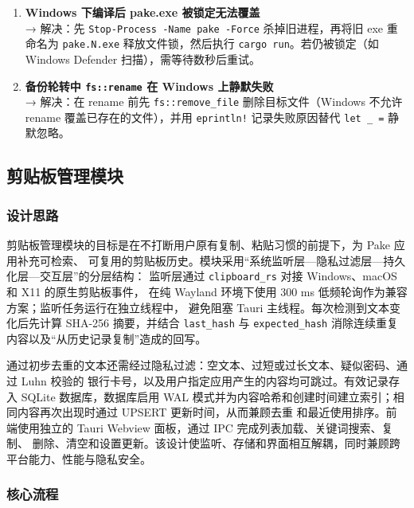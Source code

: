 \documentclass[12pt,a4paper]{ctexart}
\begin{document}
\begin{enumerate}[label=(\arabic*)]
  \item \textbf{Windows 下编译后 pake.exe 被锁定无法覆盖}
    \\→ 解决：先 \texttt{Stop-Process -Name pake -Force} 杀掉旧进程，再将旧 exe 重命名为 \texttt{pake.N.exe} 释放文件锁，然后执行 \texttt{cargo run}。若仍被锁定（如 Windows Defender 扫描），需等待数秒后重试。

  \item \textbf{备份轮转中 \texttt{fs::rename} 在 Windows 上静默失败}
    \\→ 解决：在 rename 前先 \texttt{fs::remove\_file} 删除目标文件（Windows 不允许 rename 覆盖已存在的文件），并用 \texttt{eprintln!} 记录失败原因替代 \texttt{let \_ =} 静默忽略。
\end{enumerate}

\subsection{剪贴板管理模块}

\subsubsection{设计思路}

剪贴板管理模块的目标是在不打断用户原有复制、粘贴习惯的前提下，为 Pake 应用补充可检索、
可复用的剪贴板历史。模块采用“系统监听层—隐私过滤层—持久化层—交互层”的分层结构：
监听层通过 \texttt{clipboard\_rs} 对接 Windows、macOS 和 X11 的原生剪贴板事件，
在纯 Wayland 环境下使用 300 ms 低频轮询作为兼容方案；监听任务运行在独立线程中，
避免阻塞 Tauri 主线程。每次检测到文本变化后先计算 SHA-256 摘要，并结合
\texttt{last\_hash} 与 \texttt{expected\_hash} 消除连续重复内容以及“从历史记录复制”造成的回写。

通过初步去重的文本还需经过隐私过滤：空文本、过短或过长文本、疑似密码、通过 Luhn 校验的
银行卡号，以及用户指定应用产生的内容均可跳过。有效记录存入 SQLite 数据库，数据库启用 WAL
模式并为内容哈希和创建时间建立索引；相同内容再次出现时通过 UPSERT 更新时间，从而兼顾去重
和最近使用排序。前端使用独立的 Tauri Webview 面板，通过 IPC 完成列表加载、关键词搜索、复制、
删除、清空和设置更新。该设计使监听、存储和界面相互解耦，同时兼顾跨平台能力、性能与隐私安全。

\subsubsection{核心流程}
\end{document}
